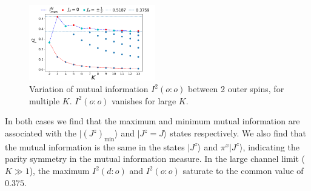 \documentclass{iopart}
\begin{document}
\begin{figure}[!htpb]
\includegraphics[width=0.49\textwidth]{NEW31DecI2vsNc12}
\caption{Variation of mutual information $I^2(o:o)$ between 2 outer spins, for multiple $K$. $I^2(o:o)$ vanishes for large $K$.}
\label{fig:MI_o_o}
\end{figure}

In both cases we find that the maximum and minimum mutual information are associated with the $|\left(J^z\right)_\mathrm{min}\rangle$ and $|J^z=J\rangle$ states respectively.
We also find that the  mutual information is the same in the states $|J^z\rangle$ and $\pi^x|J^z\rangle$, indicating the parity symmetry in the mutual information measure.
In the large channel limit ($K\gg 1$), the maximum \(I^2(d:o)\) and \(I^2(o:o)\) saturate to the common value of $0.375$.
\end{document}
